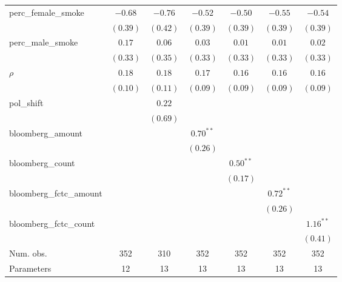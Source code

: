 \begin{table}[!h]
\begin{center}
\begin{tabular}{l c c c c c c }
perc\_female\_smoke     & $-0.68$    & $-0.76$    & $-0.52$     & $-0.50$     & $-0.55$     & $-0.54$     \\
                        & $(0.39)$   & $(0.42)$   & $(0.39)$    & $(0.39)$    & $(0.39)$    & $(0.39)$    \\
perc\_male\_smoke       & $0.17$     & $0.06$     & $0.03$      & $0.01$      & $0.01$      & $0.02$      \\
                        & $(0.33)$   & $(0.35)$   & $(0.33)$    & $(0.33)$    & $(0.33)$    & $(0.33)$    \\
$\rho$                  & $0.18$     & $0.18$     & $0.17$      & $0.16$      & $0.16$      & $0.16$      \\
                        & $(0.10)$   & $(0.11)$   & $(0.09)$    & $(0.09)$    & $(0.09)$    & $(0.09)$    \\
pol\_shift              &            & $0.22$     &             &             &             &             \\
                        &            & $(0.69)$   &             &             &             &             \\
bloomberg\_amount       &            &            & $0.70^{**}$ &             &             &             \\
                        &            &            & $(0.26)$    &             &             &             \\
bloomberg\_count        &            &            &             & $0.50^{**}$ &             &             \\
                        &            &            &             & $(0.17)$    &             &             \\
bloomberg\_fctc\_amount &            &            &             &             & $0.72^{**}$ &             \\
                        &            &            &             &             & $(0.26)$    &             \\
bloomberg\_fctc\_count  &            &            &             &             &             & $1.16^{**}$ \\
                        &            &            &             &             &             & $(0.41)$    \\
\midrule
Num. obs.               & 352        & 310        & 352         & 352         & 352         & 352         \\
Parameters              & 12         & 13         & 13          & 13          & 13          & 13          \\

\end{tabular}
\end{center}
\end{table}
